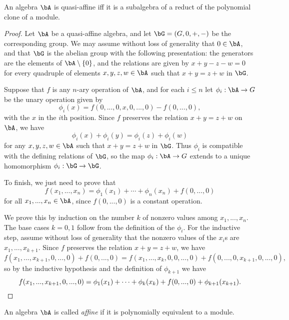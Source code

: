 \begin{prop} An algebra $\bA$ is quasi-affine iff it is a subalgebra of a reduct of the polynomial clone of a module.%
\end{prop}
\begin{proof} Let $\bA$ be a quasi-affine algebra, and let $\bG = (G,0,+,-)$ be the corresponding group. We may assume without loss of generality that $0 \in \bA$, and that $\bG$ is the abelian group with the following presentation: the generators are the elements of $\bA\setminus\{0\}$, and the relations are given by $x+y-z-w = 0$ for every quadruple of elements $x,y,z,w \in \bA$ such that $x+y = z+w$ in $\bG$.

Suppose that $f$ is any $n$-ary operation of $\bA$, and for each $i \le n$ let $\phi_i : \bA \rightarrow G$ be the unary operation given by
\[
\phi_i(x) = f(0,...,0,x,0,...,0) - f(0,...,0),
\]
with the $x$ in the $i$th position. Since $f$ preserves the relation $x+y = z+w$ on $\bA$, we have
\[
\phi_i(x) + \phi_i(y) = \phi_i(z) + \phi_i(w)
\]
for any $x,y,z,w \in \bA$ such that $x+y = z+w$ in $\bG$. Thus $\phi_i$ is compatible with the defining relations of $\bG$, so the map $\phi_i : \bA \rightarrow G$ extends to a unique homomorphism $\phi_i : \bG \rightarrow \bG$.

To finish, we just need to prove that
\[
f(x_1, ..., x_n) = \phi_1(x_1) + \cdots + \phi_n(x_n) + f(0,...,0)
\]
for all $x_1, ..., x_n \in \bA$, since $f(0,...,0)$ is a constant operation.

We prove this by induction on the number $k$ of nonzero values among $x_1, ..., x_n$. The base cases $k = 0,1$ follow from the definition of the $\phi_i$. For the inductive step, assume without loss of generality that the nonzero values of the $x_i$s are $x_1, ..., x_{k+1}$. Since $f$ preserves the relation $x+y = z+w$, we have
\[
f(x_1, ..., x_{k+1}, 0, ..., 0) + f(0,...,0) = f(x_1, ..., x_k, 0, 0, ..., 0) + f(0, ..., 0, x_{k+1}, 0, ..., 0),
\]
so by the inductive hypothesis and the definition of $\phi_{k+1}$ we have
\[
f(x_1, ..., x_{k+1}, 0, ..., 0) = \phi_1(x_1) + \cdots + \phi_k(x_k) + f(0, ..., 0) + \phi_{k+1}(x_{k+1}).\qedhere%
\]
\end{proof}

\begin{defn} An algebra $\bA$ is called \emph{affine} if it is polynomially equivalent to a module.
\end{defn}


